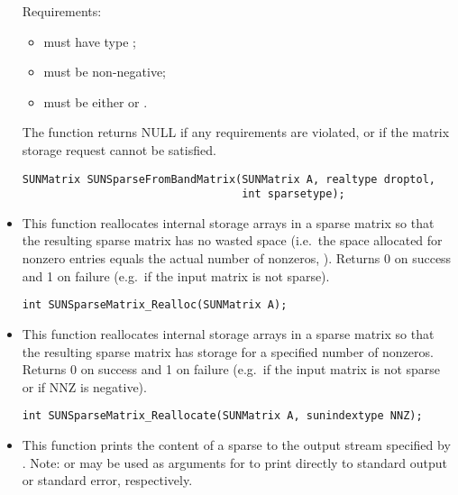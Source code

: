 \begin{itemize}
  Requirements:
  \begin{itemize}
  \item {} must have type ;
  \item {} must be non-negative;
  \item {} must be either  or .
  \end{itemize}
  The function returns NULL if any requirements are violated, or if
  the matrix storage request cannot be satisfied. 

  \begin{verbatim}
SUNMatrix SUNSparseFromBandMatrix(SUNMatrix A, realtype droptol,
                                  int sparsetype);
  \end{verbatim}


\item {}

  This function reallocates internal storage arrays in a sparse matrix
  so that the resulting sparse matrix has no wasted space (i.e.~the
  space allocated for nonzero entries equals the actual number of
  nonzeros, ). Returns 0 on success and 
  1 on failure (e.g.~if the input matrix is not sparse).

  \verb|int SUNSparseMatrix_Realloc(SUNMatrix A);|


\item {}

  This function reallocates internal storage arrays in a sparse matrix
  so that the resulting sparse matrix has storage for a specified
  number of nonzeros. Returns 0 on success and 
  1 on failure (e.g.~if the input matrix is not sparse or if NNZ is
  negative). 

  \verb|int SUNSparseMatrix_Reallocate(SUNMatrix A, sunindextype NNZ);|


\item {}

  This function prints the content of a sparse  to the
  output stream specified by .  Note: 
  or  may be used as arguments for  to print
  directly to standard output or standard error, respectively.
 

\end{itemize}
